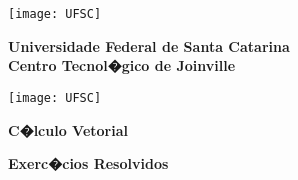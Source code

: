 \documentclass[12pt]{article}
\begin{document}

\begin{tcolorbox}[colback=black!0]                                                               %
    \noindent\begin{minipage}{0.14\linewidth}
        \hspace*{-0.2cm}\texttt{[image: UFSC]}
    \end{minipage}
    \noindent\begin{minipage}{0.69\linewidth}
        \begin{center}
            \vspace*{0.2cm}
            {\bf \Large Universidade Federal de Santa Catarina} \\ \vspace{0.3cm}
            {\bf \Large Centro Tecnol�gico de Joinville} \\ \vspace{0.3cm}
        \end{center}
    \end{minipage}
    \noindent\begin{minipage}{0.14\linewidth}
        \hspace*{1.2cm}\texttt{[image: UFSC]}
    \end{minipage}
\end{tcolorbox}


\begin{tcolorbox}[colback=black!0]
    \begin{center}
        {\Large \bf C�lculo Vetorial}
    \end{center}
    \tcblower
    \begin{center}
        {\large \bf  Exerc�cios Resolvidos}
    \end{center}
\end{tcolorbox}
\end{document}
